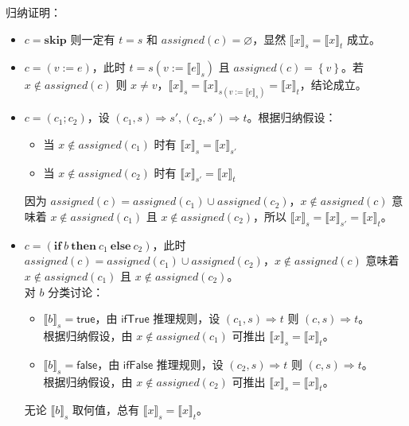 \documentclass[UTF8]{ctexart}
\begin{document}
    归纳证明：
    \begin{itemize}
        \item $c=\mathbf{skip}$ 则一定有 $t=s$ 和 $assigned(c) = \varnothing$，显然 ${\llbracket x \rrbracket}_s = {\llbracket x \rrbracket}_t$ 成立。
        \item $c=(v:=e)$，此时 $t=s(v:={\llbracket e \rrbracket}_s)$ 且 $assigned(c)=\left\{v\right\}$。若 $x \notin assigned(c)$ 则 $x \ne v$，${\llbracket x \rrbracket}_s = {\llbracket x \rrbracket}_{s(v:={\llbracket e \rrbracket}_s)} = {\llbracket x \rrbracket}_t$，结论成立。
        \item $c=(c_1; c_2)$，设 $(c_1, s) \Rightarrow s', (c_2, s') \Rightarrow t$。根据归纳假设：\begin{itemize}
            \item 当 $x \notin assigned(c_1)$ 时有 ${\llbracket x \rrbracket}_s = {\llbracket x \rrbracket}_{s'}$
            \item 当 $x \notin assigned(c_2)$ 时有 ${\llbracket x \rrbracket}_{s'} = {\llbracket x \rrbracket}_t$
        \end{itemize}
        因为 $assigned(c)=assigned(c_1) \cup assigned(c_2)$，$x \notin assigned(c)$ 意味着 $x \notin assigned(c_1)$ 且 $x \notin assigned(c_2)$，所以 ${\llbracket x \rrbracket}_s = {\llbracket x \rrbracket}_{s'} = {\llbracket x \rrbracket}_t$。
        \item $c=(\mathbf{if}\ b\ \mathbf{then}\ c_1\ \mathbf{else}\ c_2)$，此时 $assigned(c)=assigned(c_1) \cup assigned(c_2)$，$x \notin assigned(c)$ 意味着 $x \notin assigned(c_1)$ 且 $x \notin assigned(c_2)$。\\
        对 $b$ 分类讨论：\begin{itemize}
            \item ${\llbracket b \rrbracket}_s=\mathsf{true}$，由 $\mathsf{ifTrue}$ 推理规则，设 $(c_1, s) \Rightarrow t$ 则 $(c, s) \Rightarrow t$。\\
            根据归纳假设，由 $x \notin assigned(c_1)$ 可推出 ${\llbracket x \rrbracket}_s = {\llbracket x \rrbracket}_t$。
            \item ${\llbracket b \rrbracket}_s=\mathsf{false}$，由 $\mathsf{ifFalse}$ 推理规则，设 $(c_2, s) \Rightarrow t$ 则 $(c, s) \Rightarrow t$。\\
            根据归纳假设，由 $x \notin assigned(c_2)$ 可推出 ${\llbracket x \rrbracket}_s = {\llbracket x \rrbracket}_t$。
        \end{itemize}
        无论 ${\llbracket b \rrbracket}_s$ 取何值，总有 ${\llbracket x \rrbracket}_s = {\llbracket x \rrbracket}_t$。

\end{itemize}
\end{document}
